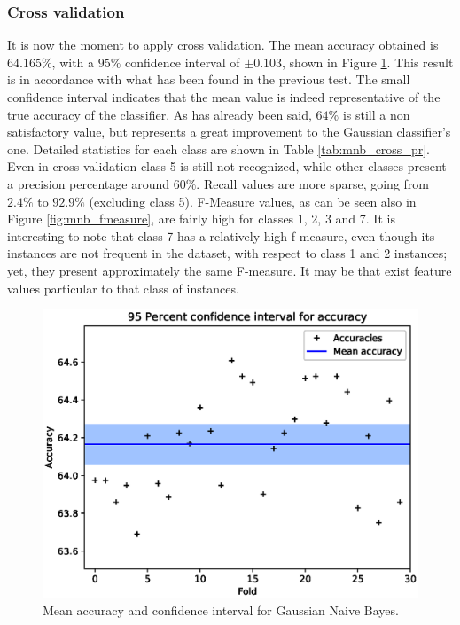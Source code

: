 \documentclass[a4paper, 10pt]{article}
\begin{document}
\subsubsection{Cross validation}
It is now the moment to apply cross validation. The mean accuracy obtained is $64.165\%$, with a $95\%$ confidence interval of $\pm0.103$, shown in Figure \ref{fig:acc_int_mnb}. This result is in accordance with what has been found in the previous test. The small confidence interval indicates that the mean value is indeed representative of the true accuracy of the classifier. As has already been said, $64\%$ is still a non satisfactory value, but represents a great improvement to the Gaussian classifier's one. Detailed statistics for each class are shown in Table \ref{tab:mnb_cross_pr}. Even in cross validation class 5 is still not recognized, while other classes present a precision percentage around $60\%$. Recall values are more sparse, going from $2.4\%$ to $92.9\%$ (excluding class 5). F-Measure values, as can be seen also in Figure \ref{fig:mnb_fmeasure}, are fairly high for classes 1, 2, 3 and 7. It is interesting to note that class 7 has a relatively high f-measure, even though its instances are not frequent in the dataset, with respect to class 1 and 2 instances; yet, they present approximately the same F-measure. It may be that exist feature values particular to that class of instances. 

\begin{figure}[H]
 \centering
 \includegraphics[width=0.8\linewidth]{pictures/nb_multi_accuracy_interval.eps}
 \caption{Mean accuracy and confidence interval for Gaussian Naive Bayes.}
 \label{fig:acc_int_mnb}
\end{figure}
\end{document}

